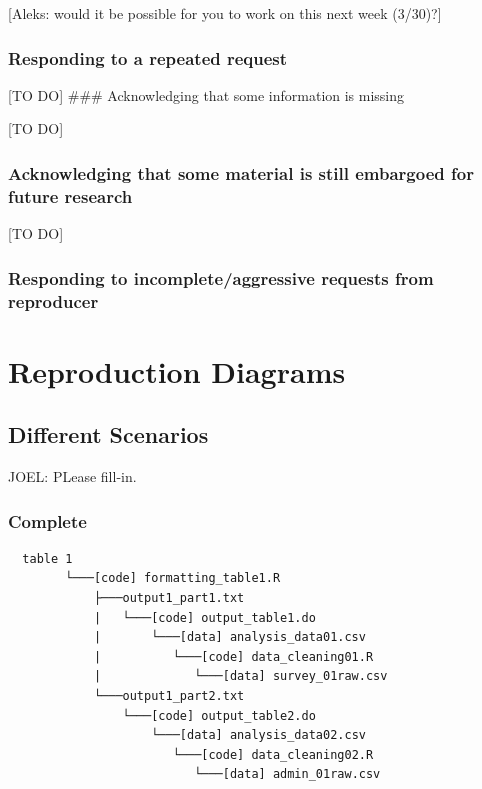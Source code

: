 \documentclass[]{book}
\begin{document}
{[}Aleks: would it be possible for you to work on this next week (3/30)?{]}

\hypertarget{responding-to-a-repeated-request}{%
\subsection{Responding to a repeated request}\label{responding-to-a-repeated-request}}

{[}TO DO{]}
\#\#\# Acknowledging that some information is missing

{[}TO DO{]}

\hypertarget{acknowledging-that-some-material-is-still-embargoed-for-future-research}{%
\subsection{Acknowledging that some material is still embargoed for future research}\label{acknowledging-that-some-material-is-still-embargoed-for-future-research}}

{[}TO DO{]}

\hypertarget{responding-to-incompleteaggressive-requests-from-reproducer}{%
\subsection{Responding to incomplete/aggressive requests from reproducer}\label{responding-to-incompleteaggressive-requests-from-reproducer}}

\hypertarget{reproduction-diagrams}{%
\chapter{Reproduction Diagrams}\label{reproduction-diagrams}}

\hypertarget{different-scenarios}{%
\section{Different Scenarios}\label{different-scenarios}}

JOEL: PLease fill-in.

\hypertarget{complete}{%
\subsection{Complete}\label{complete}}

\begin{verbatim}
  table 1
        └───[code] formatting_table1.R
            ├───output1_part1.txt  
            |   └───[code] output_table1.do           
            |       └───[data] analysis_data01.csv
            |          └───[code] data_cleaning01.R
            |             └───[data] survey_01raw.csv
            └───output1_part2.txt  
                └───[code] output_table2.do           
                    └───[data] analysis_data02.csv
                       └───[code] data_cleaning02.R
                          └───[data] admin_01raw.csv  
\end{verbatim}
\end{document}
